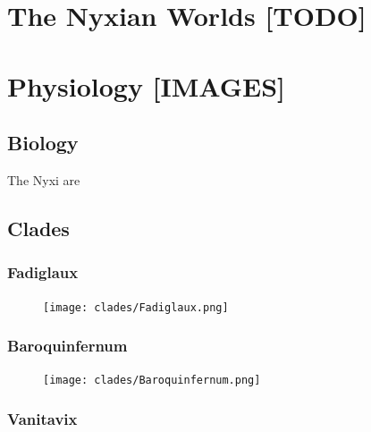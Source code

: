 
\chapter{The Nyxian Worlds [TODO]}



\chapter{Physiology [IMAGES]}

\section{Biology}

The Nyxi are

\section{Clades}

\subsection{Fadiglaux}

\begin{figure}
	\centering
	\texttt{[image: clades/Fadiglaux.png]}
\end{figure}

\lipsum[1]

\subsection{Baroquinfernum}

\begin{figure}
	\centering
	\texttt{[image: clades/Baroquinfernum.png]}
\end{figure}

\lipsum[2]

\subsection{Vanitavix}

